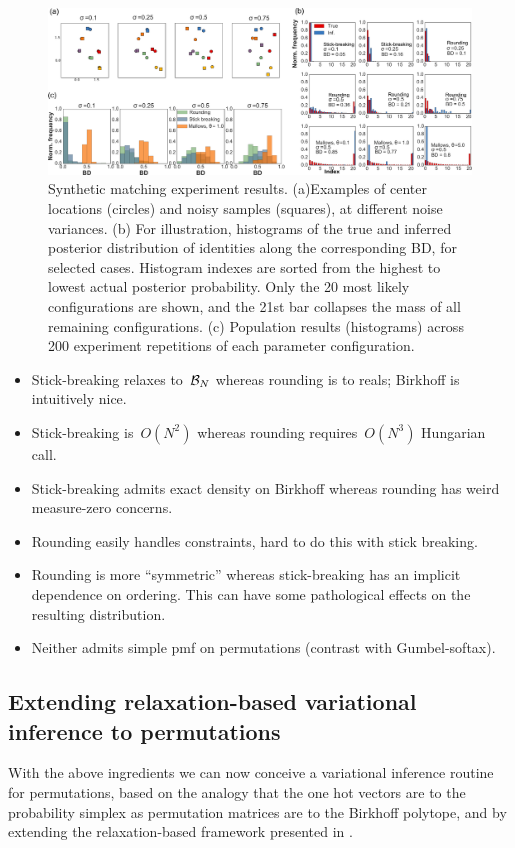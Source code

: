 \documentclass[twoside]{article}
\begin{document}
\begin{figure}[ht] 
   \centering
   \includegraphics[width=1.0\textwidth]{../figures/figure8.pdf}
   \caption{Synthetic matching experiment results. (a)Examples of center locations (circles) and noisy samples (squares), at different noise variances. (b) For illustration, histograms of the true and inferred posterior distribution of identities along the corresponding BD, for selected cases. Histogram indexes are sorted from the highest to lowest actual posterior probability. Only the 20 most likely configurations are shown, and the 21st bar collapses the mass of all remaining configurations. (c) Population results (histograms) across 200 experiment repetitions of each parameter configuration.}
   \label{fig:matching}
\end{figure}


\begin{itemize}
\item Stick-breaking relaxes to~$\mathcal{B}_N$ whereas rounding is to reals; Birkhoff is intuitively nice.
\item Stick-breaking is~$O(N^2)$ whereas rounding requires~$O(N^3)$ Hungarian call.
\item Stick-breaking admits exact density on Birkhoff whereas rounding has weird measure-zero concerns.
\item Rounding easily handles constraints, hard to do this with stick breaking.
\item Rounding is more ``symmetric'' whereas stick-breaking has an implicit dependence on ordering.  This can have some pathological effects on the resulting distribution.
\item Neither admits simple pmf on permutations (contrast with Gumbel-softax).
\end{itemize}

\subsection{Extending relaxation-based variational inference to permutations}
\label{sec:gumbel-softmax}
With the above ingredients we can now conceive a variational inference routine for permutations, based on the analogy that the one hot vectors are to the probability simplex as permutation matrices are to the Birkhoff polytope, and by extending the relaxation-based framework presented in \cite{maddison2016concrete}.
\end{document}
